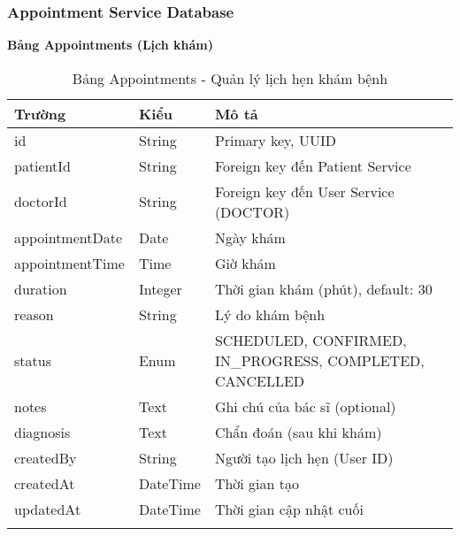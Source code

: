 \documentclass[12pt,a4paper]{report}
\begin{document}
\subsubsection{Appointment Service Database}
\textbf{Bảng Appointments (Lịch khám)}
\begin{longtable}{|p{3cm}|p{2cm}|p{8cm}|}
\hline
\textbf{Trường} & \textbf{Kiểu} & \textbf{Mô tả} \\
\hline
id & String & Primary key, UUID \\
\hline
patientId & String & Foreign key đến Patient Service \\
\hline
doctorId & String & Foreign key đến User Service (DOCTOR) \\
\hline
appointmentDate & Date & Ngày khám \\
\hline
appointmentTime & Time & Giờ khám \\
\hline
duration & Integer & Thời gian khám (phút), default: 30 \\
\hline
reason & String & Lý do khám bệnh \\
\hline
status & Enum & SCHEDULED, CONFIRMED, IN\_PROGRESS, COMPLETED, CANCELLED \\
\hline
notes & Text & Ghi chú của bác sĩ (optional) \\
\hline
diagnosis & Text & Chẩn đoán (sau khi khám) \\
\hline
createdBy & String & Người tạo lịch hẹn (User ID) \\
\hline
createdAt & DateTime & Thời gian tạo \\
\hline
updatedAt & DateTime & Thời gian cập nhật cuối \\
\hline
\caption{Bảng Appointments - Quản lý lịch hẹn khám bệnh}
\end{longtable}
\end{document}
